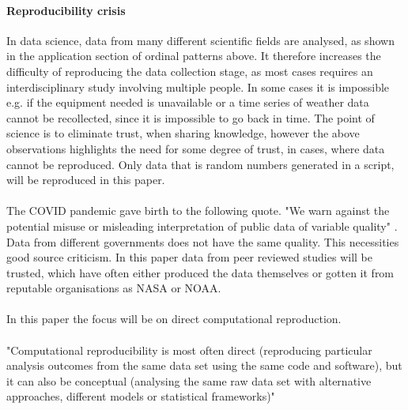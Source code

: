\paragraph{Reproducibility crisis}
In data science, data from many different scientific fields are analysed, as shown in the application section of ordinal patterns above. It therefore increases the difficulty of reproducing the data collection stage, as most cases requires an interdisciplinary study involving multiple people. In some cases it is impossible e.g. if the equipment needed is unavailable or a time series of weather data cannot be recollected, since it is impossible to go back in time. The point of science is to eliminate trust, when sharing knowledge, however the above observations highlights the need for some degree of trust, in cases, where data cannot be reproduced. Only data that is random numbers generated in a script, will be reproduced in this paper.
\\\\
The COVID pandemic gave birth to the following quote. "We warn against the potential misuse or misleading interpretation of public data of variable quality" \cite{Struelens2021}. Data from different governments does not have the same quality. This necessities good source criticism. In this paper data from peer reviewed studies will be trusted, which have often either produced the data themselves or gotten it from reputable organisations as NASA or NOAA. 
\\\\
In this paper the focus will be on direct computational reproduction.
\\\\
"Computational reproducibility is most often direct (reproducing particular analysis outcomes from the same data set using the same code and software), but it can also be conceptual (analysing the same raw data set with alternative approaches, different models or statistical frameworks)" \cite{Fidler2018}

